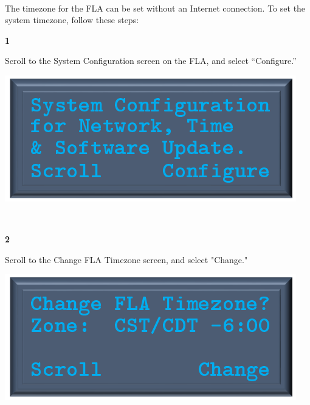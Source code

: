 \documentclass[11pt, oneside]{book}
\begin{document}
\paragraph{  }
The timezone for the FLA can be set without an Internet connection.
To set the system timezone, follow these steps:
\\[\baselineskip]
\noindent\begin{minipage}{0.45\textwidth}%
	\begin{center}
		\textbf{1}
	\end{center}
	 Scroll to the System Configuration screen on the FLA, and select ``Configure.''
\end{minipage}%
\hfill%
\begin{minipage}{0.45\textwidth} 
	\includegraphics[width=\linewidth]{../media/pstricks_files/06_system_configuration}
\end{minipage}\\[\baselineskip]
\noindent\begin{minipage}{0.45\textwidth}%
	\begin{center}
		\textbf{2}
	\end{center}
	Scroll to the Change FLA Timezone screen, and select "Change."
\end{minipage}%
\hfill%
\begin{minipage}{0.45\textwidth} 
	\includegraphics[width=\linewidth]{../media/pstricks_files/10_change_time_zone}
\end{minipage}\\[\baselineskip]
\end{document}

